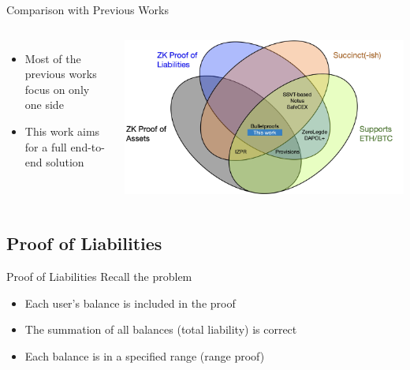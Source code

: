 \documentclass{beamer}
\begin{document}
  \begin{frame}{Comparison with Previous Works}
    \begin{columns}
        \begin{itemize}
            \item Most of the previous works focus on only one side
            \item This work aims for a full end-to-end solution
        \end{itemize}
        
        \includegraphics[scale=0.09]{venn.png}
    \end{columns}
  \end{frame}

  \subsection{Proof of Liabilities}
  \begin{frame}{Proof of Liabilities}
    Recall the problem
    \begin{itemize}
      \item Each user's balance is included in the proof
      \item The summation of all balances (total liability) is correct
      \item Each balance is in a specified range (range proof)
    \end{itemize}
  \end{frame}
\end{document}
